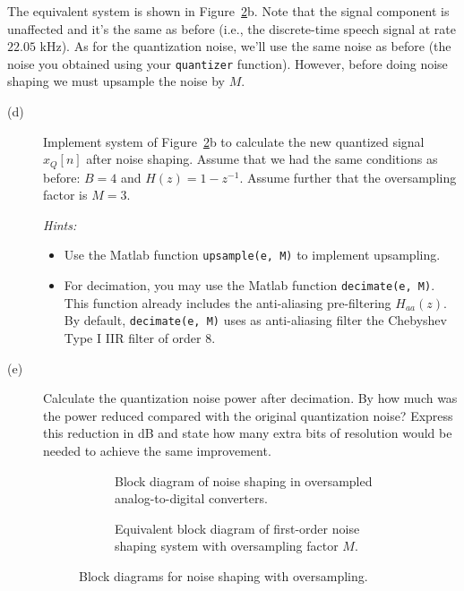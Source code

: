 \documentclass[12pt]{report}
\begin{document}
The equivalent system is shown in Figure~\ref{fig:noise_shaping_diagram2}b. Note that the signal component is unaffected and it's the same as before (i.e., the discrete-time speech signal at rate $22.05$ kHz). As for the quantization noise, we'll use the same noise as before (the noise you obtained using your \texttt{quantizer} function). However, before doing noise shaping we must upsample the noise by $M$.

\begin{description}	
	\item[(d)] Implement system of Figure~\ref{fig:noise_shaping_diagram2}b to calculate the new quantized signal $x_Q[n]$ after noise shaping. Assume that we had the same conditions as before: $B = 4$ and $H(z) = 1 - z^{-1}$. Assume further that the oversampling factor is $M = 3$. 
	
	\textit{Hints:}
	\begin{itemize}
		\item Use the Matlab function \texttt{upsample(e, M)} to implement upsampling.
		\item For decimation, you may use the Matlab function \texttt{decimate(e, M)}. This function already includes the anti-aliasing pre-filtering $H_{aa}(z)$. By default, \texttt{decimate(e, M)} uses as anti-aliasing filter the Chebyshev Type I IIR filter of order 8.
	\end{itemize}
	
	\item [(e)] Calculate the quantization noise power after decimation. By how much was the power reduced compared with the original quantization noise? Express this reduction in dB and state how many extra bits of resolution would be needed to achieve the same improvement.
		
\begin{figure}[t]
	\centering
	\begin{subfigure}{\textwidth}
		\centering
		\def\UPSAMPLE{1}
		\resizebox{0.9\textwidth}{!}{}
		\caption{Block diagram of noise shaping in oversampled analog-to-digital converters.} 
	\end{subfigure}
	
	\begin{subfigure}{\textwidth}
		\centering
		\resizebox{0.7\textwidth}{!}{}
		\caption{Equivalent block diagram of first-order noise shaping system with oversampling factor $M$.} \label{fig:noise_shaping_diagram2}
	\end{subfigure}%
	\caption{Block diagrams for noise shaping with oversampling. } \label{fig:noise_shaping_diagram2}
\end{figure}	

\end{description}
\end{document}
